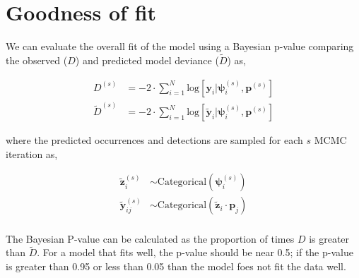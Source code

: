 \documentclass[12pt]{article}
\begin{document}
\section{Goodness of fit}
We can evaluate the overall fit of the model using a Bayesian p-value comparing the observed ($D$) and predicted model deviance ($\tilde{D}$) as,
\begin{center}
\begin{align*}
D^{(s)} &= -2\cdot \sum_{i=1}^N \text{log}[\textbf{y}_{i}|\boldsymbol{\psi}_{i}^{(s)},\boldsymbol{p}^{(s)}]\\
\tilde{D}^{(s)} &= -2\cdot \sum_{i=1}^N \text{log}[\tilde{\textbf{y}}_{i}|\boldsymbol{\psi}_{i}^{(s)},\boldsymbol{p}^{(s)}]
\end{align*}
\end{center}
where the predicted occurrences and detections are sampled for each $s$ MCMC iteration as,
\begin{center}
\begin{align*}
\tilde{\boldsymbol{z}}^{(s)}_{i} &\sim \text{Categorical}(\boldsymbol{\psi}^{(s)}_{i})\\
\tilde{\boldsymbol{y}}^{(s)}_{ij} &\sim  \text{Categorical}(\tilde{\textbf{z}}_{i} \cdot \boldsymbol{p}_{j})\\
\end{align*}
\end{center}

The Bayesian P-value can be calculated as the proportion of times $D$ is greater than $\tilde{D}$. For a model that fits well, the p-value should be near 0.5; if the p-value is greater than 0.95 or less than 0.05 than the model foes not fit the data well.


\pagebreak
\end{document}
